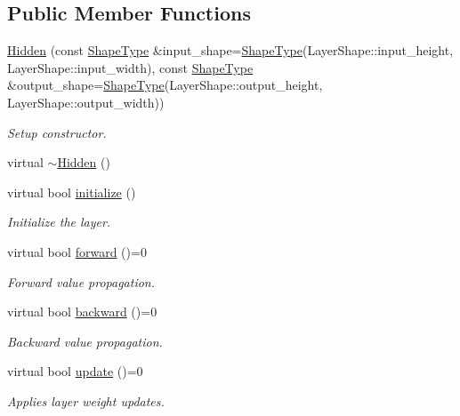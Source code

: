 \subsection*{Public Member Functions}
\begin{DoxyCompactItemize}
\item 
\hyperlink{classffnn_1_1layer_1_1_hidden_a3caeb739cac8995496db207e32900fca}{Hidden} (const \hyperlink{classffnn_1_1layer_1_1_hidden_abdfcf81b3846fae3b19a207424695df0}{Shape\-Type} \&input\-\_\-shape=\hyperlink{classffnn_1_1layer_1_1_hidden_abdfcf81b3846fae3b19a207424695df0}{Shape\-Type}(Layer\-Shape\-::input\-\_\-height, Layer\-Shape\-::input\-\_\-width), const \hyperlink{classffnn_1_1layer_1_1_hidden_abdfcf81b3846fae3b19a207424695df0}{Shape\-Type} \&output\-\_\-shape=\hyperlink{classffnn_1_1layer_1_1_hidden_abdfcf81b3846fae3b19a207424695df0}{Shape\-Type}(Layer\-Shape\-::output\-\_\-height, Layer\-Shape\-::output\-\_\-width))
\begin{DoxyCompactList}\small\item\em Setup constructor. \end{DoxyCompactList}\item 
virtual \hyperlink{classffnn_1_1layer_1_1_hidden_a0dad92c0b04b2e41efcde9462ba3e123}{$\sim$\-Hidden} ()
\item 
virtual bool \hyperlink{classffnn_1_1layer_1_1_hidden_a0bf259cd8d070ce21c90a34d86b173ee}{initialize} ()
\begin{DoxyCompactList}\small\item\em Initialize the layer. \end{DoxyCompactList}\item 
virtual bool \hyperlink{classffnn_1_1layer_1_1_hidden_a600b86d72826e8be3eafa53e040e9cbe}{forward} ()=0
\begin{DoxyCompactList}\small\item\em Forward value propagation. \end{DoxyCompactList}\item 
virtual bool \hyperlink{classffnn_1_1layer_1_1_hidden_aac0ee89390b02ff4731678883dd402dd}{backward} ()=0
\begin{DoxyCompactList}\small\item\em Backward value propagation. \end{DoxyCompactList}\item 
virtual bool \hyperlink{classffnn_1_1layer_1_1_hidden_ae038d2a1e64fcbbde6166df7d0573ef8}{update} ()=0
\begin{DoxyCompactList}\small\item\em Applies layer weight updates. \end{DoxyCompactList}\end{DoxyCompactItemize}
